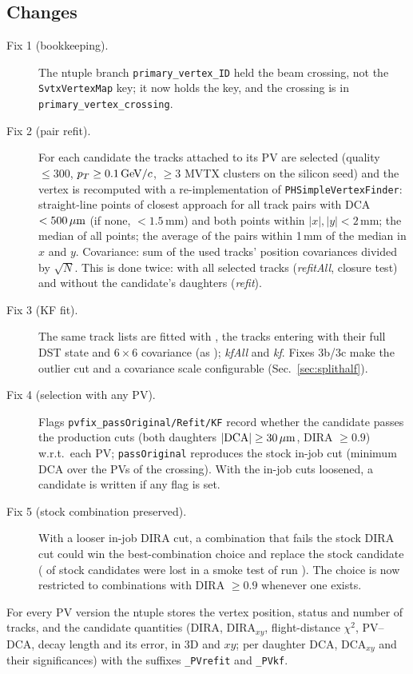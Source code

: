 \subsection{Changes}
\begin{description}
\item[Fix 1 (bookkeeping).] The ntuple branch \texttt{primary\_vertex\_ID} held the beam crossing, not the
  \texttt{SvtxVertexMap} key; it now holds the key, and the crossing is in \texttt{primary\_vertex\_crossing}.
\item[Fix 2 (pair refit).] For each candidate the tracks attached to its PV are selected (quality $\leq 300$,
  $p_T\geq0.1\,\mathrm{GeV}/c$, $\geq3$ MVTX clusters on the silicon seed) and the vertex is recomputed with a re-implementation of
  \texttt{PHSimpleVertexFinder}: straight-line points of closest approach for all track pairs with DCA $<500\,\mu\mathrm{m}$
  (if none, $<1.5$\,mm) and both points within $|x|,|y|<2$\,mm; the median of all points; the average of the pairs within
  1\,mm of the median in $x$ and $y$. Covariance: sum of the used tracks' position covariances divided by
  $\sqrt{N}$. This is done twice: with all selected tracks (\emph{refitAll}, closure test) and without the candidate's
  daughters (\emph{refit}).
\item[Fix 3 (KF fit).] The same track lists are fitted with , the tracks entering
  with their full DST state and $6\times6$ covariance (as ); \emph{kfAll} and
  \emph{kf}. Fixes 3b/3c make the outlier cut and a covariance scale configurable (Sec.~\ref{sec:splithalf}).
\item[Fix 4 (selection with any PV).] Flags \texttt{pvfix\_passOriginal/Refit/KF} record whether the candidate passes
  the production cuts (both daughters $|{\rm DCA}|\geq30\,\mu\mathrm{m}$, DIRA $\geq0.9$) w.r.t.\ each PV; \texttt{passOriginal}
  reproduces the stock in-job cut (minimum DCA over the PVs of the crossing). With the in-job cuts loosened, a candidate
  is written if any flag is set.
\item[Fix 5 (stock combination preserved).] With a looser in-job DIRA cut, a combination that fails the stock DIRA cut
  could win the best-combination choice and replace the stock candidate (\smNoFiveMissB{} of \smStockB{} stock candidates were lost in a
  smoke test of run \smRunB). The choice is now restricted to combinations with DIRA $\geq 0.9$ whenever one exists.
\end{description}
For every PV version the ntuple stores the vertex position, status and number of tracks, and the candidate quantities
(DIRA, DIRA$_{xy}$, flight-distance $\chi^2$, PV--DCA, decay length and its error, in 3D and $xy$; per daughter DCA,
DCA$_{xy}$ and their significances) with the suffixes \texttt{\_PVrefit} and \texttt{\_PVkf}.

